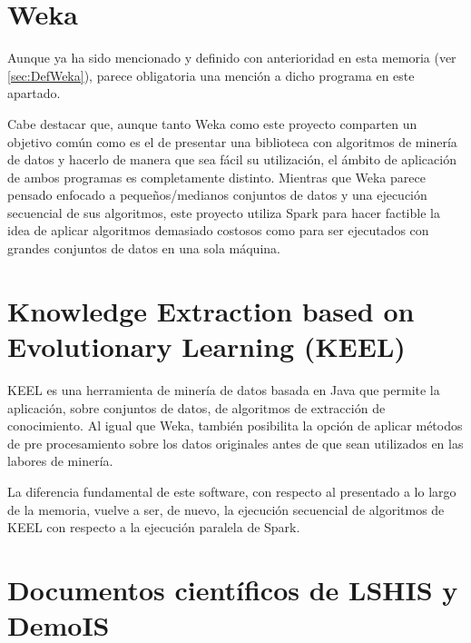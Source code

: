 

\section{Weka}

Aunque ya ha sido mencionado y definido con anterioridad en esta memoria (ver \ref{sec:DefWeka}), parece obligatoria una mención a dicho programa en este apartado.

Cabe destacar que, aunque tanto Weka como este proyecto comparten un objetivo común como es el de presentar una biblioteca con algoritmos de minería de datos y hacerlo de manera que sea fácil su utilización, el ámbito de aplicación de ambos programas es completamente distinto. Mientras que Weka parece pensado enfocado a pequeños/medianos conjuntos de datos y una ejecución secuencial de sus algoritmos, este proyecto utiliza Spark para hacer factible la idea de aplicar algoritmos demasiado costosos como para ser ejecutados con grandes conjuntos de datos en una sola máquina.

\section{Knowledge Extraction based on Evolutionary Learning (KEEL)}

KEEL \cite{KEELSoft1}\cite{KEELSoft2} es una herramienta de minería de datos basada en Java que permite la aplicación, sobre conjuntos de datos, de algoritmos de extracción de conocimiento. Al igual que Weka, también posibilita la opción de aplicar métodos de pre procesamiento sobre los datos originales antes de que sean utilizados en las labores de minería.

La diferencia fundamental de este software, con respecto al presentado a lo largo de la memoria, vuelve a ser, de nuevo, la ejecución secuencial de algoritmos de KEEL con respecto a la ejecución paralela de Spark.

\section{Documentos científicos de LSHIS y DemoIS}

